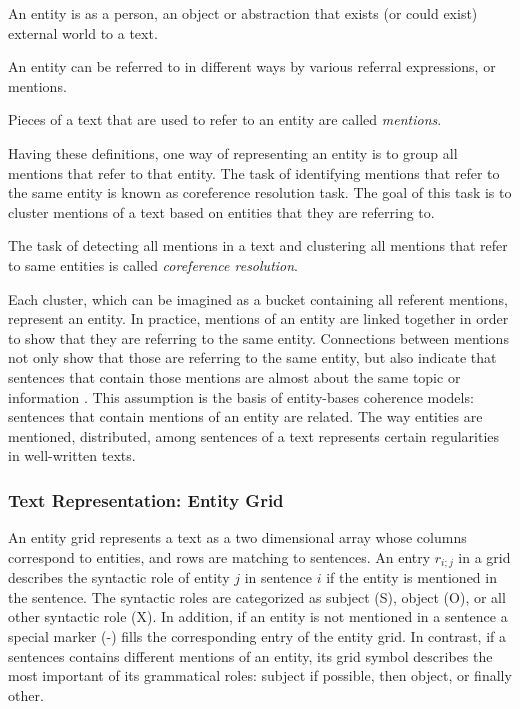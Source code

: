 \begin{definition}
    An entity is as a person, an object or abstraction that exists (or could exist) external world to a text. 
\end{definition}

An entity can be referred to in different ways by various referral expressions, or mentions. 

\begin{definition}
	Pieces of a text that are used to refer to an entity are called \emph{mentions}. 
\end{definition}

Having these definitions, one way of representing an entity is to group all mentions that refer to that entity. 
The task of identifying mentions that refer to the same entity is known as coreference resolution task.  
The goal of this task is to cluster mentions of a text based on entities that they are referring to.  

\begin{definition}
	The task of detecting all mentions in a text and clustering all mentions that refer to same entities is called \emph{coreference resolution}. 
\end{definition}

Each cluster, which can be imagined as a bucket containing all referent mentions, represent an entity. 
In practice, mentions of an entity are linked together in order to show that they are referring to the same entity. 
Connections between mentions not only show that those are referring to the same entity, but also indicate that sentences that contain those mentions are almost about the same topic or information \cite{barzilay08}.  
This assumption is the basis of entity-bases coherence models: sentences that contain mentions of an entity are related. 
The way entities are mentioned, distributed, among sentences of a text represents certain regularities in well-written texts. 


\subsubsection{Text Representation: Entity Grid}

An entity grid represents a text as a two dimensional array whose columns correspond to entities, and rows are matching to sentences.
An entry $r_{i;j}$ in a grid describes the syntactic role of entity $j$ in sentence $i$ if the entity is mentioned in the sentence. 
The syntactic roles are categorized as subject (S), object (O), or all other syntactic role (X). 
In addition, if an entity is not mentioned in a sentence a special marker (-) fills the corresponding entry of the entity grid. 
In contrast, if a sentences contains different mentions of an entity, its grid symbol describes the most important of its grammatical roles: subject if possible, then object, or finally other. 

